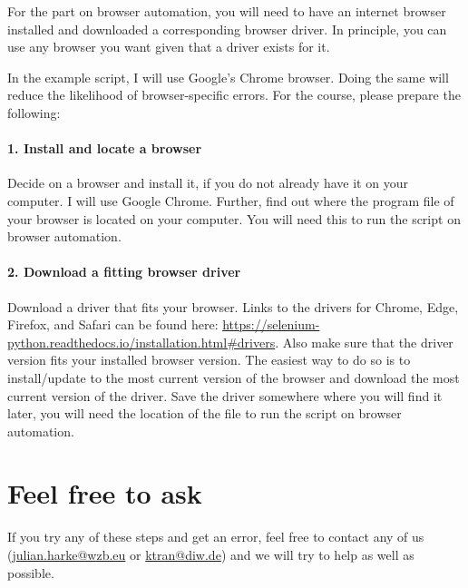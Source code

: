 \documentclass[a4paper]{article}
\begin{document}
For the part on browser automation, you will need to have an internet browser installed and downloaded a corresponding browser driver. In principle, you can use any browser you want given that a driver exists for it.

In the example script, I will use Google's Chrome browser. Doing the same will reduce the likelihood of browser-specific errors. For the course, please prepare the following:

\paragraph{1. Install and locate a browser} Decide on a browser and install it, if you do not already have it on your computer. I will use Google Chrome. Further, find out where the program file of your browser is located on your computer. You will need this to run the script on browser automation.

\paragraph{2. Download a fitting browser driver} Download a driver that fits your browser. Links to the drivers for Chrome, Edge, Firefox, and Safari can be found here: \url{https://selenium-python.readthedocs.io/installation.html#drivers}. Also make sure that the driver version fits your installed browser version. The easiest way to do so is to install/update to the most current version of the browser and download the most current version of the driver. Save the driver somewhere where you will find it later, you will need the location of the file to run the script on browser automation.

\section{Feel free to ask}

If you try any of these steps and get an error, feel free to contact any of us (\href{mailto:julian.harke@wzb.eu}{julian.harke@wzb.eu} or \href{mailto:ktran@diw.de}{ktran@diw.de}) and we will try to help as well as possible.
\end{document}
